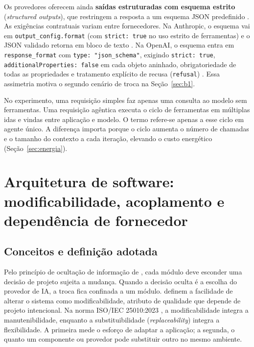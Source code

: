 Os provedores oferecem ainda \textbf{saídas estruturadas com esquema estrito}
(\textit{structured outputs}), que restringem a resposta a um esquema JSON
predefinido \cite{anthropicstructured,openaistructured}. As exigências
contratuais variam entre fornecedores. Na Anthropic, o esquema vai em
\texttt{output\_config.format} (com \texttt{strict: true} no uso estrito de
ferramentas) e o JSON validado retorna em bloco de texto
\cite{anthropicstructured}. Na OpenAI, o esquema entra em
\texttt{response\_format} com \texttt{type: "json\_schema"}, exigindo
\texttt{strict: true}, \texttt{additionalProperties: false} em cada objeto
aninhado, obrigatoriedade de todas as propriedades e tratamento explícito de
recusa (\texttt{refusal}) \cite{openaistructured}. Essa assimetria motiva o
segundo cenário de troca na Seção~\ref{sec:b1}.

No experimento, uma requisição simples faz apenas uma consulta ao modelo sem
ferramentas. Uma requisição agêntica executa o ciclo de ferramentas em múltiplas
idas e vindas entre aplicação e modelo. O termo refere-se apenas a esse ciclo em
agente único. A diferença importa porque o ciclo aumenta o número de chamadas e
o tamanho do contexto a cada iteração, elevando o custo energético
(Seção~\ref{sec:energia}).

\section{Arquitetura de software: modificabilidade, acoplamento e dependência de fornecedor}
\label{sec:arquitetura}

\subsection{Conceitos e definição adotada}
\label{subsec:arq-conceitos}

Pelo princípio de ocultação de informação de , cada
módulo deve esconder uma decisão de projeto sujeita a mudança. Quando a decisão
oculta é a escolha do provedor de IA, a troca fica confinada a um módulo.
 definem a facilidade de alterar o sistema como
modificabilidade, atributo de qualidade que depende de projeto intencional. Na
norma ISO/IEC 25010:2023 \cite{iso25010}, a modificabilidade integra a
manutenibilidade, enquanto a substituibilidade (\textit{replaceability}) integra
a flexibilidade. A primeira mede o esforço de adaptar a aplicação; a segunda, o
quanto um componente ou provedor pode substituir outro no mesmo ambiente.

